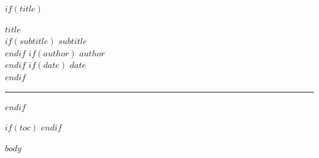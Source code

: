 \documentclass[$if(fontsize)$$fontsize$$else$10pt$endif$,$for(classoption)$$classoption$$sep$,$endfor$]{article}
\begin{document}
$if(title)$
\begin{center}
{\huge\bfseries\color{primary} $title$}\\[8pt]
$if(subtitle)${\large\color{headergray} $subtitle$}\\[6pt]$endif$
$if(author)${\normalsize\color{headergray} $author$}\\[4pt]$endif$
$if(date)${\small\color{headergray} $date$}\\[4pt]$endif$
\end{center}
\vspace{2pt}
{\color{accent}\rule{\textwidth}{1.5pt}}
\vspace{12pt}
$endif$

$if(toc)$
\tableofcontents
\clearpage
$endif$

$body$
\end{document}

